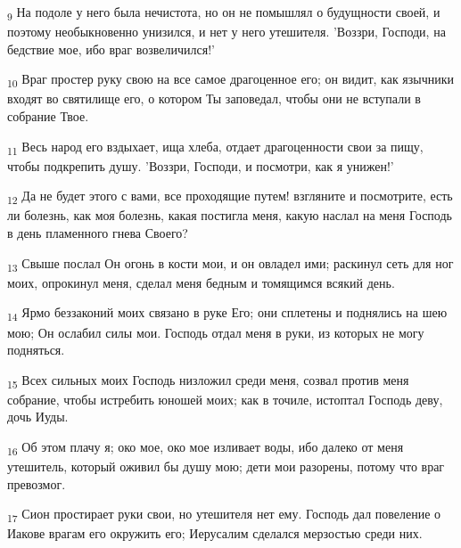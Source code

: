 \begin{tcolorbox}
\textsubscript{9} На подоле у него была нечистота, но он не помышлял о будущности своей, и поэтому необыкновенно унизился, и нет у него утешителя. 'Воззри, Господи, на бедствие мое, ибо враг возвеличился!'
\end{tcolorbox}
\begin{tcolorbox}
\textsubscript{10} Враг простер руку свою на все самое драгоценное его; он видит, как язычники входят во святилище его, о котором Ты заповедал, чтобы они не вступали в собрание Твое.
\end{tcolorbox}
\begin{tcolorbox}
\textsubscript{11} Весь народ его вздыхает, ища хлеба, отдает драгоценности свои за пищу, чтобы подкрепить душу. 'Воззри, Господи, и посмотри, как я унижен!'
\end{tcolorbox}
\begin{tcolorbox}
\textsubscript{12} Да не будет этого с вами, все проходящие путем! взгляните и посмотрите, есть ли болезнь, как моя болезнь, какая постигла меня, какую наслал на меня Господь в день пламенного гнева Своего?
\end{tcolorbox}
\begin{tcolorbox}
\textsubscript{13} Свыше послал Он огонь в кости мои, и он овладел ими; раскинул сеть для ног моих, опрокинул меня, сделал меня бедным и томящимся всякий день.
\end{tcolorbox}
\begin{tcolorbox}
\textsubscript{14} Ярмо беззаконий моих связано в руке Его; они сплетены и поднялись на шею мою; Он ослабил силы мои. Господь отдал меня в руки, из которых не могу подняться.
\end{tcolorbox}
\begin{tcolorbox}
\textsubscript{15} Всех сильных моих Господь низложил среди меня, созвал против меня собрание, чтобы истребить юношей моих; как в точиле, истоптал Господь деву, дочь Иуды.
\end{tcolorbox}
\begin{tcolorbox}
\textsubscript{16} Об этом плачу я; око мое, око мое изливает воды, ибо далеко от меня утешитель, который оживил бы душу мою; дети мои разорены, потому что враг превозмог.
\end{tcolorbox}
\begin{tcolorbox}
\textsubscript{17} Сион простирает руки свои, но утешителя нет ему. Господь дал повеление о Иакове врагам его окружить его; Иерусалим сделался мерзостью среди них.
\end{tcolorbox}
